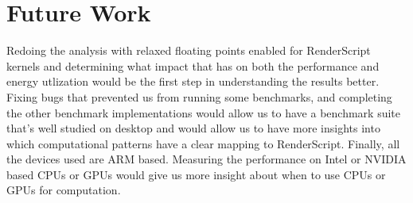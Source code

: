 \section{Future Work}
\label{sec:future}

Redoing the analysis with relaxed floating points enabled for RenderScript kernels
	and determining what impact that has on both the performance and energy utlization
	would be the first step in understanding the results better.
Fixing bugs that prevented us from running some benchmarks, and completing the
	other benchmark implementations would allow us to have a benchmark
	suite that's well studied on desktop and would allow us to have more insights
	into which computational patterns have a clear mapping to RenderScript.
Finally, all the devices used are ARM based.
Measuring the performance on Intel or NVIDIA based CPUs or GPUs would give us
	more insight about when to use CPUs or GPUs for computation.